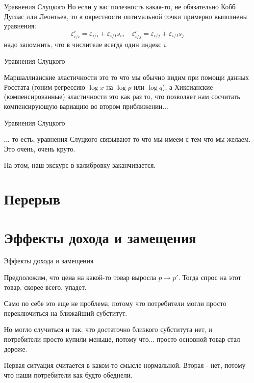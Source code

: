 \documentclass{beamer}
\begin{document}
\begin{frame}{Уравнения Слуцкого}
Но если у вас полезность какая-то, не обязательно Кобб Дуглас или Леонтьев, то в окрестности оптимальной точки примерно выполнены уравнения:
$$ \varepsilon^c_{i/i} = \varepsilon_{i/i} + \varepsilon_{i/I}s_i, \quad \varepsilon^c_{i/j} = \varepsilon_{i/j} + \varepsilon_{i/I}s_j$$
надо запомнить, что \alert{в числителе всегда один индекс $i$}.
\end{frame}

\begin{frame}{Уравнения Слуцкого}

Маршаллианские эластичности это то что мы обычно видим при помощи данных Росстата (гоним регрессию $\log x$ на $\log p$ или $\log q$), а Хиксианские (компенсированные) эластичности это как раз то, что позволяет нам сосчитать компенсирующую вариацию во втором приближении...

\end{frame}

\begin{frame}{Уравнения Слуцкого}

... то есть, уравнения Слуцкого связывают то что мы имеем с тем что мы желаем. Это очень, очень круто.

На этом, наш экскурс в калибровку заканчивается.
\end{frame}

\section{Перерыв}

\section{Эффекты дохода и замещения}

\begin{frame}{Эффекты дохода и замещения}

Предположим, что цена на какой-то товар выросла $p \to p'$. Тогда спрос на этот товар, скорее всего, упадет. 

Само по себе это еще не проблема, потому что потребители могли просто переключиться на ближайший субститут. 

Но могло случиться и так, что достаточно близкого субститута нет, и потребители просто купили меньше, потому что... просто основной товар стал дороже. 

Первая ситуация считается в каком-то смысле нормальной. Вторая - нет, потому что наши потребители как будто обеднели.
\end{frame}
\end{document}
